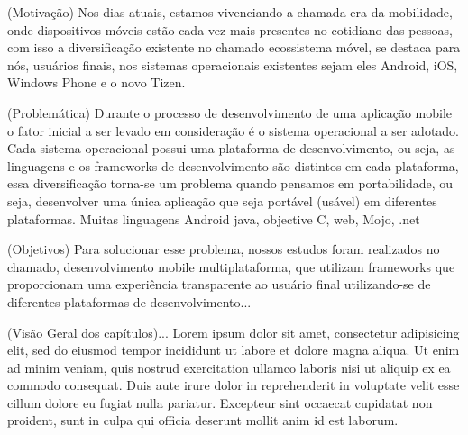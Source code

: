 (Motivação) Nos dias atuais, estamos vivenciando a chamada era da mobilidade, onde dispositivos
móveis estão cada vez mais presentes no cotidiano das pessoas, com isso a
diversificação existente no chamado ecossistema móvel, se destaca para nós,
usuários finais, nos sistemas operacionais existentes sejam eles Android, iOS,
Windows Phone e o novo Tizen. \cite{adriel2012titanium}

(Problemática) Durante o processo de desenvolvimento de uma aplicação mobile o
fator inicial a ser levado em consideração é o sistema operacional a ser adotado.
Cada sistema operacional possui uma plataforma de desenvolvimento, ou seja, as
linguagens e os frameworks de desenvolvimento são distintos em cada plataforma,
essa diversificação torna-se um problema quando pensamos em portabilidade,
ou seja, desenvolver uma única aplicação que seja portável (usável) em
diferentes plataformas.
Muitas linguagens Android java, objective C, web, Mojo, .net

(Objetivos) Para solucionar esse problema, nossos estudos foram realizados no
chamado, desenvolvimento mobile multiplataforma, que utilizam frameworks que
proporcionam uma experiência transparente ao usuário final utilizando-se de
diferentes plataformas de desenvolvimento...

(Visão Geral dos capítulos)...
Lorem ipsum dolor sit amet, consectetur adipisicing elit, sed do eiusmod
tempor incididunt ut labore et dolore magna aliqua. Ut enim ad minim veniam,
quis nostrud exercitation ullamco laboris nisi ut aliquip ex ea commodo
consequat. Duis aute irure dolor in reprehenderit in voluptate velit esse
cillum dolore eu fugiat nulla pariatur. Excepteur sint occaecat cupidatat non
proident, sunt in culpa qui officia deserunt mollit anim id est laborum.


